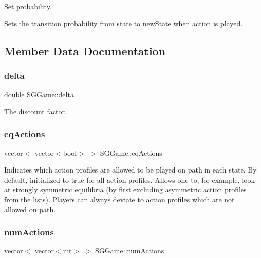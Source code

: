 Set probability. 

Sets the transition probability from state to new\+State when action is played. 

\subsection{Member Data Documentation}
\mbox{\label{classSGGame_a5031fc31f8009c19901c0930224e0465}} 
\subsubsection{\texorpdfstring{delta}{delta}}
{\footnotesize\ttfamily double S\+G\+Game\+::delta\hspace{0.3cm}{\ttfamily [private]}}

The discount factor. \mbox{\label{classSGGame_aacb0878b1e95ef3ff42cb88ac617c0b8}} 
\subsubsection{\texorpdfstring{eq\+Actions}{eqActions}}
{\footnotesize\ttfamily vector$<$ vector$<$bool$>$ $>$ S\+G\+Game\+::eq\+Actions\hspace{0.3cm}{\ttfamily [private]}}

Indicates which action profiles are allowed to be played on path in each state. By default, initialized to true for all action profiles. Allows one to, for example, look at strongly symmetric equilibria (by first excluding asymmetric action profiles from the lists). Players can always deviate to action profiles which are not allowed on path. \mbox{\label{classSGGame_acebe94d195ffb67f92925bcd4c26d1a9}} 
\subsubsection{\texorpdfstring{num\+Actions}{numActions}}
{\footnotesize\ttfamily vector$<$ vector$<$int$>$ $>$ S\+G\+Game\+::num\+Actions\hspace{0.3cm}{\ttfamily [private]}}

